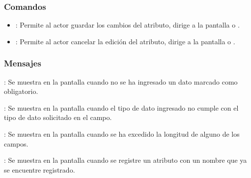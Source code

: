 \subsubsection{Comandos}
\begin{itemize}
	\item {}: Permite al actor guardar los cambios del atributo, dirige a la pantalla  o .
	\item {}: Permite al actor cancelar la edición del atributo, dirige a la pantalla  o .
\end{itemize}

\subsubsection{Mensajes}

\begin{Citemize}
	\item {}: Se muestra en la pantalla  cuando no se ha ingresado un dato marcado como obligatorio.
	\item {}: Se muestra en la pantalla  cuando el tipo de dato ingresado no cumple con el tipo de dato solicitado en el campo.
	\item {}: Se muestra en la pantalla  cuando se ha excedido la longitud de alguno de los campos.
	\item {}: Se muestra en la pantalla  cuando se registre un atributo con un nombre que ya se encuentre registrado.
\end{Citemize}
